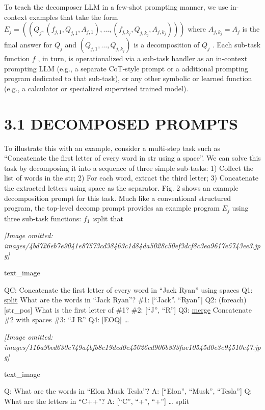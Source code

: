 \documentclass[
]{article}
\begin{document}
To teach the decomposer LLM in a few-shot prompting manner, we use
in-context examples that take the form
\(E_{j} = \left(\left(Q_{j},\left(f_{j,1},Q_{j,1},A_{j,1}\right),\dots,\left(f_{j,k_{j}},Q_{j,k_{j}},A_{j,k_{j}}\right)\right)\right)\)
where \(A_{j,k_j} = A_j\) is the final answer for \(Q_{j}\) and
\((Q_{j,1},\dots ,Q_{j,k_j})\) is a decomposition of \(Q_{j}\) . Each
sub-task function \(f\) , in turn, is operationalized via a sub-task
handler as an in-context prompting LLM (e.g., a separate CoT-style
prompt or a additional prompting program dedicated to that sub-task), or
any other symbolic or learned function (e.g., a calculator or
specialized supervised trained model).

\section{3.1 DECOMPOSED PROMPTS}\label{decomposed-prompts}

To illustrate this with an example, consider a multi-step task such as
``Concatenate the first letter of every word in str using a space''. We
can solve this task by decomposing it into a sequence of three simple
sub-tasks: 1) Collect the list of words in the str; 2) For each word,
extract the third letter; 3) Concatenate the extracted letters using
space as the separator. Fig. 2 shows an example decomposition prompt for
this task. Much like a conventional structured program, the top-level
decomp prompt provides an example program \(E_{j}\) using three sub-task
functions: \(f_{1}\) :split that

\textit{[Image omitted: images/4bd726eb7e9041e87573cd38463c1d84da5028c50ef3dcf8c3ea9617e5743ee3.jpg]}

text\_image

QC: Concatenate the first letter of every word in ``Jack Ryan'' using
spaces Q1: \hyperref[split]{split} What are the words in ``Jack Ryan''?
\#1: {[}``Jack''. ``Ryan''{]} Q2: (foreach) {[}str\_pos{]} What is the
first letter of \#1? \#2: {[}``J'', ``R''{]} Q3: \hyperref[merge]{merge}
Concatenate \#2 with spaces \#3: ``J R'' Q4: {[}EOQ{]} \ldots{}

\textit{[Image omitted: images/116a9bed630e749a4bfb8c19dcd0c45026ed906b833fae10545d0e3e94510e47.jpg]}

text\_image

Q: What are the words in ``Elon Musk Tesla''? A: {[}``Elon'', ``Musk'',
``Tesla''{]} Q: What are the letters in ``C++''? A: {[}``C'', ``+'',
``+''{]} \ldots{} split
\end{document}
